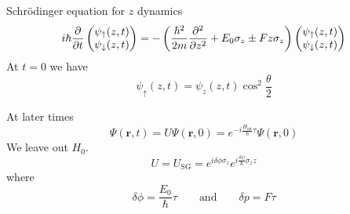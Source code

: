 \documentclass[11pt, a4paper]{article}
\newcommand{\Schro}{Schr\"{o}dinger\xspace}
\renewcommand{\vec}[1]{\bm{#1}}  %
\newcommand{\ua}{\uparrow}  %
\newcommand{\da}{\downarrow}  %
\renewcommand{\r}{\vec{r}}  %
\newcommand{\p}{\psi}  %
\begin{document}
\begin{itemize}
    \Schro equation for $ z $ dynamics
    \begin{equation*}
        i \hbar \pdv{t} 
        \begin{pmatrix}
            \psi_{\ua}(z, t)\\
            \psi_{\da}(z, t)
        \end{pmatrix}
        = - \left( \frac{\hbar^{2}}{2m}\pdv[2]{}{z} + E_{0}\sigma_{z} \pm F z \sigma_{z} \right)
        \begin{pmatrix}
            \psi_{\ua}(z, t)\\
            \psi_{\da}(z, t)
        \end{pmatrix}
    \end{equation*}
    At $ t = 0 $ we have
    \begin{equation*}
        \psi_{\ua}(z, t) = \p_{z}(z, t) \cos^{2}\frac{\theta}{2}
    \end{equation*}


    At later times
    \begin{equation*}
        \Psi(\r, t) = U \Psi(\r, 0) = e^{-i \frac{H_{\text{int}}}{\hbar}\tau}\Psi(\r, 0)
    \end{equation*}
    We leave out $ H_{0} $. 
    \begin{equation*}
        U = U_{\text{SG}} = e^{i \delta\phi \sigma_{z}} e^{i \frac{\delta\psi}{\hbar} \sigma_{z}z} 
    \end{equation*}
    where
    \begin{equation*}
        \delta\phi = \frac{E_{0}}{\hbar} \tau \qquad \text{and} \qquad \delta p = F\tau
    \end{equation*}



\end{itemize}
\end{document}
